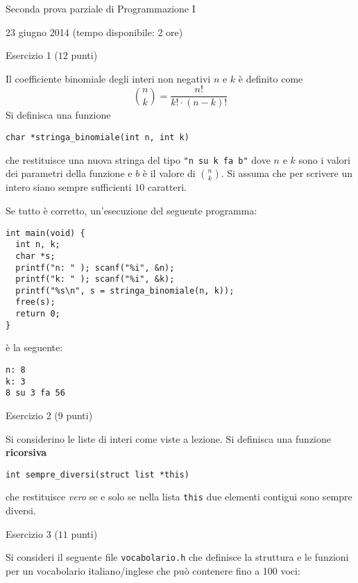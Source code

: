\documentclass[italian,12pt]{article}
\begin{document}
\begin{center}{\LARGE Seconda prova parziale di Programmazione I}\\
\begin{center}
  \Large 23 giugno 2014 (tempo disponibile: 2 ore)
\end{center}
\end{center}
\vspace*{2ex}
\begin{center}{\Large Esercizio 1} ($12$ punti)
\end{center}
Il coefficiente binomiale degli interi non negativi $n$ e $k$ \`e definito come
\[
  {{n}\choose{k}}=\frac{n!}{k!\cdot(n - k)!}
\]
%
Si definisca una funzione
%
\begin{verbatim}
char *stringa_binomiale(int n, int k)
\end{verbatim}
%
che restituisce una nuova stringa del tipo \verb|"n su k fa b"| dove $n$ e $k$ sono i valori dei parametri
della funzione e $b$ \`e il valore di $n\choose k$. Si assuma che per scrivere un intero siano sempre sufficienti
$10$ caratteri.

Se tutto \`e corretto, un'esecuzione del seguente programma:

{\scriptsize
\begin{verbatim}
int main(void) {
  int n, k;
  char *s;
  printf("n: " ); scanf("%i", &n);
  printf("k: " ); scanf("%i", &k);
  printf("%s\n", s = stringa_binomiale(n, k));
  free(s);
  return 0;
}
\end{verbatim}}

\noindent
\`e la seguente:
%
{\scriptsize
\begin{verbatim}
n: 8
k: 3
8 su 3 fa 56
\end{verbatim}}

\begin{center}{\Large Esercizio 2} ($9$ punti)\end{center}
%
Si considerino le liste di interi come viste a lezione. Si definisca una funzione \textbf{ricorsiva}
%
\begin{verbatim}
int sempre_diversi(struct list *this)
\end{verbatim}
%
che restituisce \emph{vero} se e solo se nella lista \texttt{this} due elementi contigui sono sempre diversi.
%
\begin{center}{\Large Esercizio 3} ($11$ punti)\end{center}
%
Si consideri il seguente file \texttt{vocabolario.h} che definisce la struttura e le funzioni per un vocabolario italiano/inglese
che pu\`o contenere fino a 100 voci:
\end{document}
